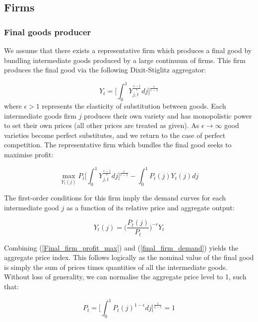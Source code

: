 \documentclass[titlepage, 11pt, a4paper]{article}
\renewcommand{\&}{and}
\begin{document}
\begin{appendices}
\subsection{Firms} 

\subsubsection{Final goods producer}
We assume that there exists a representative firm which produces a final good by bundling intermediate goods produced by a large continuum of firms. This firm produces the final good via the following Dixit-Stiglitz aggregator:

\begin{equation} \label{final_goods_1}
    Y_t= \Bigg[\int_0^1 Y_{j,t}^{\frac{\epsilon -1}{\epsilon}} dj \Bigg]^{\frac{\epsilon}{\epsilon - 1}}
\end{equation}
where $\epsilon > 1$ represents the elasticity of substitution between goods. Each intermediate goods firm $j$ produces their own variety and has monopolistic power to set their own prices (all other prices are treated as given). As $\epsilon \rightarrow \infty$ good varieties become perfect substitutes, and we return to the case of perfect competition. The representative firm which bundles the final good seeks to maximise profit:

\begin{equation} \label{Final_firm_profit_max}
    \max\limits_{Y_t(j)} P_t\Bigg[\int_0^1 Y_{j,t}^{\frac{\epsilon -1}{\epsilon}} dj \Bigg]^{\frac{\epsilon}{\epsilon - 1}} - \int_0^1 P_t(j)Y_t(j) dj
    \end{equation}

The first-order conditions for this firm imply the demand curves for each intermediate good $j$ as a function of its relative price and aggregate output:

\begin{equation} \label{final_firm_demand}
    Y_t(j) = \Big(\frac{P_t(j)}{P_t}\Big)^{-\epsilon}Y_t 
\end{equation}

Combining  (\ref{Final_firm_profit_max}) and (\ref{final_firm_demand}) yields the aggregate price index. This follows logically as the nominal value of the final good is simply the sum of prices times quantities of all the intermediate goods. Without loss of generality, we can normalise the aggregate price level to 1, such that:

\begin{equation}
    P_t = \Big[\int_0^1 P_t(j)^{1-\epsilon}dj\Big]^{\frac{1}{1-\epsilon}} \label{AggPrice} = 1
\end{equation}


\end{appendices}
\end{document}
